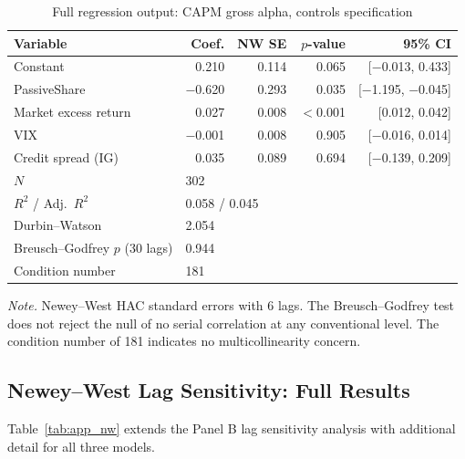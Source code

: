 \documentclass[11pt, a4paper]{article}
\begin{document}
\begin{table}[H]
\centering
\caption{Full regression output: CAPM gross alpha, controls specification}
\label{tab:app_full_capm}
\small
\begin{tabular}{lrrrr}
\toprule
\textbf{Variable} & \textbf{Coef.} & \textbf{NW SE} & \textbf{$p$-value} & \textbf{95\% CI} \\
\midrule
Constant              & 0.210  & 0.114 & 0.065 & [$-$0.013, 0.433] \\
PassiveShare          & $-$0.620 & 0.293 & 0.035 & [$-$1.195, $-$0.045] \\
Market excess return  & 0.027  & 0.008 & $<$0.001 & [0.012, 0.042] \\
VIX                   & $-$0.001 & 0.008 & 0.905 & [$-$0.016, 0.014] \\
Credit spread (IG)    & 0.035  & 0.089 & 0.694 & [$-$0.139, 0.209] \\
\midrule
$N$ & \multicolumn{4}{l}{302} \\
$R^2$ / Adj.\ $R^2$ & \multicolumn{4}{l}{0.058 / 0.045} \\
Durbin--Watson & \multicolumn{4}{l}{2.054} \\
Breusch--Godfrey $p$ (30 lags) & \multicolumn{4}{l}{0.944} \\
Condition number & \multicolumn{4}{l}{181} \\
\bottomrule
\end{tabular}
\begin{flushleft}
\small\textit{Note.} Newey--West HAC standard errors with 6 lags. The Breusch--Godfrey test does not reject the null of no serial correlation at any conventional level. The condition number of 181 indicates no multicollinearity concern.
\end{flushleft}
\end{table}

\subsection{Newey--West Lag Sensitivity: Full Results}
\label{app:nw_sensitivity}

Table~\ref{tab:app_nw} extends the Panel B lag sensitivity analysis with additional detail for all three models.
\end{document}
